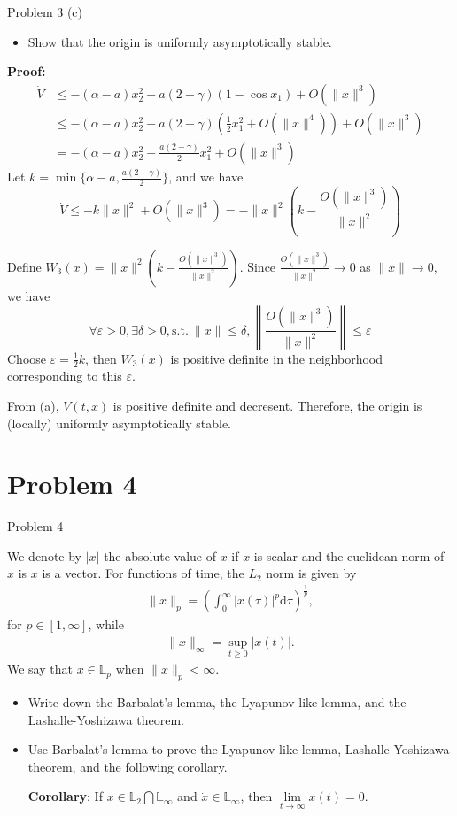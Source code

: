 \documentclass[8pt]{beamer}
\begin{document}
\begin{frame}[t]{Problem 3 (c)}
  \begin{block}{}
\begin{itemize}
  \item[(c)] Show that the origin is uniformly asymptotically stable.
\end{itemize}
\end{block}
{\bf Proof:}
    \begin{align*}
      \dot V&\leq-(\alpha-a)x_2^2-a(2-\gamma)(1-\cos x_1)+O(\|x\|^3)\\
       &\leq -(\alpha-a)x_2^2-a(2-\gamma)\left(\frac{1}{2}x_1^2+O(\|x\|^4)\right)+O(\|x\|^3) \\
        &=-(\alpha-a)x_2^2-\frac{a(2-\gamma)}{2}x_1^2+O(\|x\|^3)
    \end{align*}
    Let $k=\min\{\alpha-a,\frac{a(2-\gamma)}{2}\}$, and we have \[\dot V\le -k\|x\|^2+O(\|x\|^3)=-\|x\|^2\left(k-\frac{O(\|x\|^3)}{\|x\|^2}\right)\]
    
    Define $W_3(x)=\|x\|^2\left(k-\frac{O(\|x\|^3)}{\|x\|^2}\right)$. Since $\frac{O(\|x\|^3)}{\|x\|^2} \to 0$ as $\|x\|\to 0$, we have 
    \[\forall \varepsilon>0,\exists \delta>0, \text{s.t.}\ \|x\|\le\delta, \left\|\frac{O(\|x\|^3)}{\|x\|^2}\right\|\le\varepsilon\]
    Choose $\varepsilon=\frac{1}{2}k$, then $W_3(x)$ is positive definite in the neighborhood corresponding to this $\varepsilon$.

    From (a), $V(t,x)$ is positive definite and decresent. Therefore, the origin is (locally) uniformly asymptotically stable.
\end{frame}

\section{Problem 4}
\begin{frame}[t]{Problem 4}
  \begin{block}{}
    We denote by $|x|$ the absolute value of $x$ if $x$ is scalar and the euclidean norm of $x$ is $x$ is a
vector. For functions of time, the $L_2$ norm is given by
\begin{align*}
\|x\|_p=\left(\int_0^{\infty}|x(\tau)|^p\mbox{d}\tau\right)^{\frac{1}{p}},
\end{align*}
for $p\in[1,\infty]$, while
\begin{align*}
\|x\|_{\infty}=\sup_{t\geq 0} |x(t)|.
\end{align*}
We say that $x\in\mathbb{L}_p$ when $\|x\|_p<\infty$.


\begin{itemize}
\item[(a)] Write down the Barbalat's lemma, the Lyapunov-like lemma, and the Lashalle-Yoshizawa theorem.
\item[(b)] Use Barbalat's lemma to prove the Lyapunov-like lemma, Lashalle-Yoshizawa theorem, and the following corollary.

\textbf{Corollary}: If $x\in \mathbb{L}_2\bigcap\mathbb{L}_{\infty}$ and $\dot x\in \mathbb{L}_{\infty}$, then $\lim\limits_{t\to\infty}x(t)=0$.
\end{itemize}
  \end{block}
\end{frame}
\end{document}
